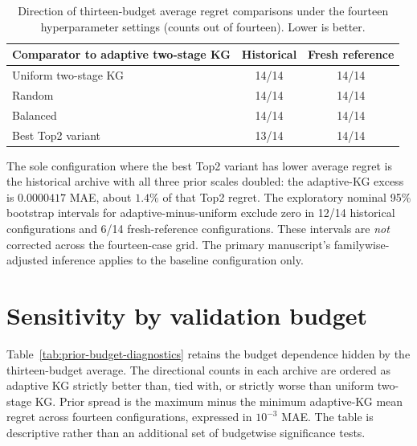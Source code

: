 \documentclass[10pt,a4paper]{article}
\begin{document}
\begin{table}[ht]
\centering
\small
\caption{Direction of thirteen-budget average regret comparisons under the
fourteen hyperparameter settings (counts out of fourteen). Lower is better.}
\label{tab:aggregate}
\begin{tabular}{lcc}
\toprule
Comparator to adaptive two-stage KG & Historical & Fresh reference\\
\midrule
Uniform two-stage KG & 14/14 & 14/14\\
Random & 14/14 & 14/14\\
Balanced & 14/14 & 14/14\\
Best Top2 variant & 13/14 & 14/14\\
\bottomrule
\end{tabular}
\end{table}

The sole configuration where the best Top2 variant has lower average
regret is the historical archive with all three prior scales doubled:
the adaptive-KG excess is $0.0000417$ MAE, about $1.4\%$ of that Top2
regret. The exploratory nominal 95\% bootstrap intervals for
adaptive-minus-uniform exclude zero in 12/14 historical configurations
and 6/14 fresh-reference configurations. These intervals are
\emph{not} corrected across the fourteen-case grid. The primary
manuscript's familywise-adjusted inference applies to the baseline
configuration only.

\section*{Sensitivity by validation budget}
Table~\ref{tab:prior-budget-diagnostics} retains the budget dependence
hidden by the thirteen-budget average. The directional counts in each
archive are ordered as adaptive KG strictly better than, tied with, or
strictly worse than uniform two-stage KG. Prior spread is the
maximum minus the minimum adaptive-KG mean regret across fourteen
configurations, expressed in $10^{-3}$ MAE. The table is descriptive
rather than an additional set of budgetwise significance tests.
\end{document}
